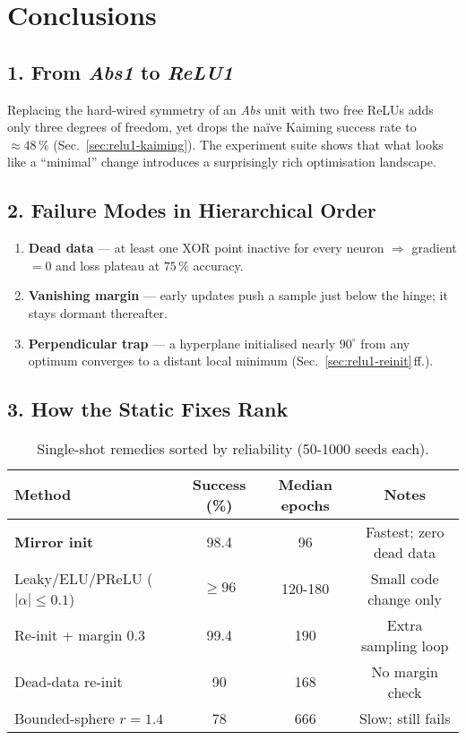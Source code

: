 \section{Conclusions}
\label{sec:relu1-conclusions}

\subsection*{1.  From \textit{Abs1} to \textit{ReLU1}}
Replacing the hard-wired symmetry of an \emph{Abs} unit with two free
ReLUs adds only three degrees of freedom, yet drops the naïve Kaiming
success rate to $\approx 48\,\%$ (Sec.~\ref{sec:relu1-kaiming}).  
The experiment suite shows that what looks like a “minimal” change
introduces a surprisingly rich optimisation landscape.

\subsection*{2.  Failure Modes in Hierarchical Order}
\begin{enumerate}[label=(F\arabic*)]
  \item \textbf{Dead data} — at least one XOR point inactive for every
        neuron \(\Rightarrow\) gradient $=0$ and loss plateau at
        $75\,\%$ accuracy.
  \item \textbf{Vanishing margin} — early updates push a sample just
        below the hinge; it stays dormant thereafter.
  \item \textbf{Perpendicular trap} — a hyperplane initialised nearly
        $90^{\circ}$ from any optimum converges to a distant local
        minimum (Sec.~\ref{sec:relu1-reinit}\,ff.).
\end{enumerate}

\subsection*{3.  How the Static Fixes Rank}
\begin{table}[h]
\centering
\caption{Single-shot remedies sorted by reliability (50-1000 seeds each).}
\label{tab:relu1-static-summary}
\begin{tabular}{lccc}
\toprule
Method & Success (\%) & Median epochs & Notes\\
\midrule
\textbf{Mirror init} & 98.4 & 96 & Fastest; zero dead data\\
Leaky/ELU/PReLU ($|\alpha|\!\le\!0.1$) & $\ge96$ & 120-180 & Small code change only\\
Re-init + margin 0.3 & 99.4 & 190 & Extra sampling loop\\
Dead-data re-init & 90 & 168 & No margin check\\
Bounded-sphere $r=1.4$ & 78 & 666 & Slow; still fails\\
\bottomrule
\end{tabular}
\end{table}

